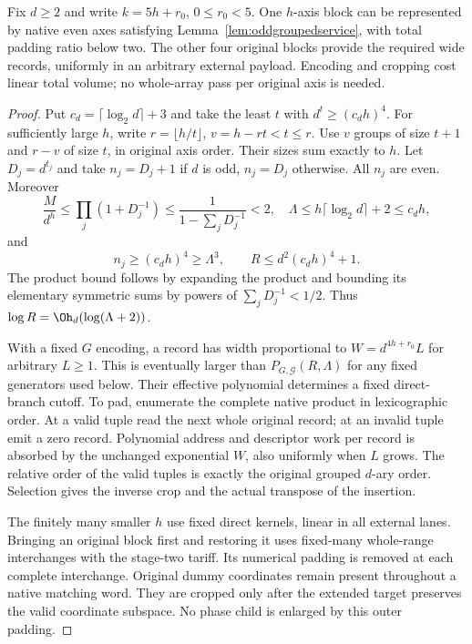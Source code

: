 \begin{paperlemma}
\label{lem:oddgroupedpadding}
Fix $d\ge2$ and write $k=5h+r_0$, $0\le r_0<5$. One $h$-axis block
can be represented by native even axes satisfying
Lemma~\ref{lem:oddgroupedservice}, with total padding ratio below two.
The other four original blocks provide the required wide records,
uniformly in an arbitrary external payload. Encoding and cropping cost
linear total volume; no whole-array pass per original axis is needed.
\end{paperlemma}
\begin{proof}
Put $c_d=\lceil\log_2d\rceil+3$ and take the least $t$ with
$d^t\ge(c_dh)^4$. For sufficiently large $h$, write
$r=\lfloor h/t\rfloor$, $v=h-rt<t\le r$. Use $v$ groups of size
$t+1$ and $r-v$ of size $t$, in original axis order. Their sizes
sum exactly to $h$. Let $D_j=d^{t_j}$ and take $n_j=D_j+1$ if $d$
is odd, $n_j=D_j$ otherwise. All $n_j$ are even. Moreover
\[
 \frac{M}{d^h}\le\prod_j(1+D_j^{-1})
 \le\frac1{1-\sum_jD_j^{-1}}<2,
 \quad \Lambda\le h\lceil\log_2d\rceil+2\le c_dh,
\]
and
\[
 n_j\ge(c_dh)^4\ge\Lambda^3,\qquad
 R\le d^2(c_dh)^4+1.
\]
The product bound follows by expanding the product and bounding its
elementary symmetric sums by powers of $\sum_jD_j^{-1}<1/2$.
Thus $\log R=\Oh_d(\log(\Lambda+2))$.

With a fixed $G$ encoding, a record has width proportional to
$W=d^{4h+r_0}L$ for arbitrary $L\ge1$. This is eventually larger
than $P_{G,\mathcal G}(R,\Lambda)$ for any fixed generators used below.
Their effective polynomial determines a fixed direct-branch cutoff.
To pad, enumerate the complete native product
in lexicographic order. At a valid tuple read the next whole original
record; at an invalid tuple emit a zero record. Polynomial address and
descriptor work per record is absorbed by the unchanged exponential
$W$, also uniformly when $L$ grows. The relative order of the valid
tuples is exactly the original grouped $d$-ary order. Selection gives
the inverse crop and the actual transpose of the insertion.

The finitely many smaller $h$ use fixed direct kernels, linear in all
external lanes. Bringing an original block first and restoring it uses
fixed-many whole-range interchanges with the stage-two tariff. Its
numerical padding is removed at each complete interchange. Original
dummy coordinates remain present throughout a native matching word.
They are cropped only after the extended target preserves the valid
coordinate subspace. No phase child is enlarged by this outer padding.
\end{proof}

